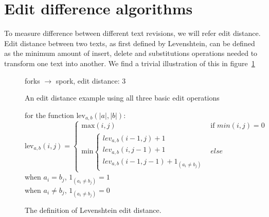 \section{Edit difference algorithms}
To measure difference between different text revisions, we will refer
edit distance. Edit distance between two texts, as first defined by
Levenshtein,\cite{Levenshtein1966} can be defined as the minimum
amount of insert, delete and substitutions operations needed to
transform one text into another. We find a trivial illustration of
this in figure~\ref{fig:fork-spork}

\begin{figure}
  \centering
  

  \vspace{3 mm}

  forks $\rightarrow$ spork, edit distance: 3
  
  \caption{An edit distance example using all three basic edit
    operations}
  \label{fig:fork-spork}
\end{figure}

\begin{figure}
  \label{fig:levdef}
  \centering
  for the function $\mbox{lev}_{a,b}(|a|,|b|)$:\\
  $$\mbox{lev}_{a,b}(i,j) = 
  \left\{
  \begin{array}{ll}
    \mbox{max}(i,j) & \mbox{if }min(i,j) = 0\\
    \mbox{min}\left\{
    \begin{array}{lll}
      lev_{a,b}(i-1,j)+1\\
      lev_{a,b}(i,j-1)+1\\
      lev_{a,b}(i-1,j-1)+1_{(a_i{\neq}b_j)}
    \end{array}
    \right.
    & else 
  \end{array}
  \right.$$
  when $a_i = b_j$, $1_{(a_i{\neq}b_j)} = 1$\\
  when  $a_i \neq b_j$, $1_{(a_i{\neq}b_j)} = 0$
  \caption{The definition of Levenshtein edit distance.}
\end{figure}

